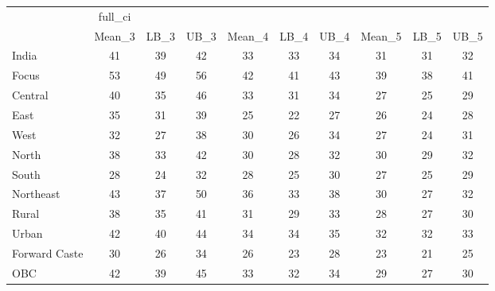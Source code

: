\begin{tabular}{l*{9}{c}}
\toprule
                    &     full\_ci&            &            &            &            &            &            &            &            \\
                    &      Mean\_3&        LB\_3&        UB\_3&      Mean\_4&        LB\_4&        UB\_4&      Mean\_5&        LB\_5&        UB\_5\\
\midrule
India               &          41&          39&          42&          33&          33&          34&          31&          31&          32\\
Focus               &          53&          49&          56&          42&          41&          43&          39&          38&          41\\
Central             &          40&          35&          46&          33&          31&          34&          27&          25&          29\\
East                &          35&          31&          39&          25&          22&          27&          26&          24&          28\\
West                &          32&          27&          38&          30&          26&          34&          27&          24&          31\\
North               &          38&          33&          42&          30&          28&          32&          30&          29&          32\\
South               &          28&          24&          32&          28&          25&          30&          27&          25&          29\\
Northeast           &          43&          37&          50&          36&          33&          38&          30&          27&          32\\
Rural               &          38&          35&          41&          31&          29&          33&          28&          27&          30\\
Urban               &          42&          40&          44&          34&          34&          35&          32&          32&          33\\
Forward Caste       &          30&          26&          34&          26&          23&          28&          23&          21&          25\\
OBC                 &          42&          39&          45&          33&          32&          34&          29&          27&          30\\

\end{tabular}
